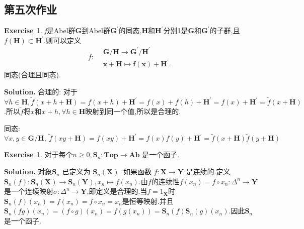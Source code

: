 \documentclass[a4paper]{book}
\newenvironment{solution}%
{\noindent\textbf{Solution.}}%
{\qedhere}
\numberwithin{equation}{chapter}
\theoremstyle{definition}
\newtheorem{exc}[exm]{Exercise}
\begin{document}
\begin{multicols}{2}
\setlength{\columnseprule}{0.2pt}  

\section{第五次作业}

\begin{exc}
	\textit{f}是Abel群\textbf{G}到Abel群$\mathbf{G}^\prime$的同态,\textbf{H}和$ \textbf{H}^\prime $分别1是\textbf{G}和$ \textbf{G}^\prime $的子群,且$ f(\textbf{H}) \subset \textbf{H}^\prime $.则可以定义
	\begin{equation}\nonumber
	\widetilde{f} : \begin{aligned}
	&\mathbf{G/H \rightarrow G^\prime / H^\prime} \\
	&\mathbf{x + H \mapsto f(x) + H^\prime }.
	\end{aligned}
	\end{equation}
	同态(合理且同态).
\end{exc}

\begin{solution}
	合理的: 对于$\forall h \in \textbf{H} , \widetilde{f}(x + h + \mathbf{H}) = f(x+h) + \textbf{H}^\prime = f(x) + f(h) + \textbf{H}^\prime = f(x) + \textbf{H}^\prime = \widetilde{f}(x + \textbf{H}) $.所以$ \widetilde{f} $将$ x $和$ x + h,\forall h \in \textbf{H} $映射到同一个值,所以是合理的.
	
	同态: $ \forall x,y \in \textbf{G/H},\ \widetilde{f}(xy + \textbf{H}) = f(xy) + \textbf{H}^\prime = f(x)f(y) + \textbf{H}^\prime = \widetilde{f}(x + \textbf{H})\widetilde{f}(y + \textbf{H}) $
\end{solution}

\begin{exc}
	对于每个$ n \geq 0 , \mathbf{S}_n : \mathbf{Top \rightarrow Ab}$ 是一个函子.
\end{exc}

\begin{solution}
	对象$ \textbf{S}_n $ 已定义为 $ \textbf{S}_n(\textbf{X}) $. 如果函数 $ f: \textbf{X} \rightarrow \textbf{Y} $ 是连续的.定义 $ \textbf{S}_n(f): \textbf{S}_n(\textbf{X}) \rightarrow \textbf{S}_n(\textbf{Y}), x_n \mapsto f(x_n) $.由$ f $的连续性$ f(x_n) = f \circ x_n : \Delta^n \rightarrow \textbf{Y} $是一个连续映射$ \sigma: \Delta^n \rightarrow \textbf{Y} $,即定义是合理的.当$ f = 1_{\textbf{X}} $时$ \textbf{S}_n(f)(x_n) = f(x_n) = f \circ x_n = x_n $是恒等映射.并且$ \textbf{S}_n(fg)(x_n) = (f \circ g)(x_n) = f(g(x_n)) = \textbf{S}_n(f)\textbf{S}_n(g)(x_n) $.因此$ \textbf{S}_n $是一个函子.
\end{solution}


\end{multicols}
\end{document}

